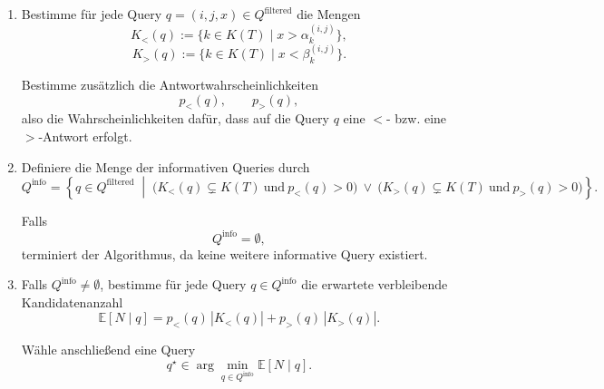 \documentclass{article}
\begin{document}
\begin{enumerate}
Die gefilterte Query-Menge ist dann gegeben durch
\[
Q^{\mathrm{filtered}}
=
Q_{\mathrm{left}}^{\mathrm{filtered}}
\cup
Q_{\mathrm{right}}^{\mathrm{filtered}}.
\]





\item
Bestimme f\"ur jede Query \(q=(i,j,x)\in Q^{\mathrm{filtered}}\) die Mengen
\[
K_{<}(q):=\{k\in K(T)\mid x>\alpha_k^{(i,j)}\},
\]
\[
K_{>}(q):=\{k\in K(T)\mid x<\beta_k^{(i,j)}\}.
\]

Bestimme zus\"atzlich die Antwortwahrscheinlichkeiten
\[
p_{<}(q),\qquad p_{>}(q),
\]
also die Wahrscheinlichkeiten daf\"ur, dass auf die Query \(q\) eine
\(<\)- bzw. eine \(>\)-Antwort erfolgt.

\item
Definiere die Menge der informativen Queries durch
\[
Q^{\mathrm{info}}
=
\left\{
q\in Q^{\mathrm{filtered}}
\;\middle|\;
\bigl(K_{<}(q)\subsetneq K(T)\ \text{und}\ p_{<}(q)>0\bigr)
\ \lor\
\bigl(K_{>}(q)\subsetneq K(T)\ \text{und}\ p_{>}(q)>0\bigr)
\right\}.
\]


Falls
\[
Q^{\mathrm{info}}=\emptyset,
\]
terminiert der Algorithmus, da keine weitere informative Query existiert.

\item
Falls \(Q^{\mathrm{info}}\neq\emptyset\), bestimme f\"ur jede Query
\(q\in Q^{\mathrm{info}}\) die erwartete verbleibende Kandidatenanzahl
\[
\mathbb{E}[N\mid q]
=
p_{<}(q)\,|K_{<}(q)|
+
p_{>}(q)\,|K_{>}(q)|.
\]

W\"ahle anschlie\ss end eine Query
\[
q^\star \in \arg\min_{q\in Q^{\mathrm{info}}} \mathbb{E}[N\mid q].
\]

\end{enumerate}
\end{document}
